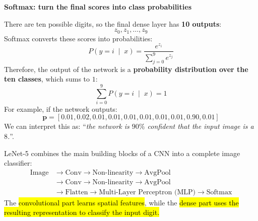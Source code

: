 \newpage

\begin{flushleft}
    \textcolor{Green3}{ \textbf{Softmax: turn the final scores into class probabilities}}
\end{flushleft}
There are ten possible digits, so the final dense layer has \textbf{10 outputs}:
\begin{equation*}
    z_0, z_1, \dots, z_9
\end{equation*}
Softmax converts these scores into probabilities:
\begin{equation*}
    P\left(y=i \; \mid \; x\right) = \frac{e^{z_i}}{\sum_{j=0}^{9} e^{z_j}}
\end{equation*}
Therefore, the output of the network is a \textbf{probability distribution over the ten classes}, which sums to $1$:
\begin{equation*}
    \sum_{i=0}^{9} P\left(y=i \; \mid \; x\right) = 1
\end{equation*}
For example, if the network outputs:
\begin{equation*}
    \mathbf{p} = \left[0.01, 0.02, 0.01, 0.01, 0.01, 0.01, 0.01, 0.01, \mathbf{0.90}, 0.01\right]
\end{equation*}
We can interpret this as: ``\emph{the network is $90\%$ confident that the input image is a $8$.}''.

\begin{takeawaysbox}
    LeNet-5 combines the main building blocks of a CNN into a complete image classifier:
    \begin{align*}
        \text{Image} &\to \text{Conv} \to \text{Non-linearity} \to \text{AvgPool} \\
        &\to \text{Conv} \to \text{Non-linearity} \to \text{AvgPool} \\
        &\to \text{Flatten} \to \text{Multi-Layer Perceptron (MLP)} \to \text{Softmax}
    \end{align*}
    The \hl{convolutional part learns spatial features}, while the \hl{dense part uses the resulting representation to classify the input digit.}
\end{takeawaysbox}

